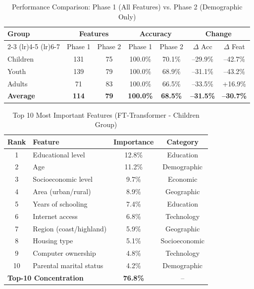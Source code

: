 \documentclass{article}
\begin{document}

\begin{table}[ht]
\centering
\caption{Performance Comparison: Phase 1 (All Features) vs. Phase 2 (Demographic Only)}
\label{tab:phase1_vs_phase2}
\begin{tabular}{lcccccc}
\toprule
\multirow{2}{*}{\textbf{Group}} & \multicolumn{2}{c}{\textbf{Features}} & \multicolumn{2}{c}{\textbf{Accuracy}} & \multicolumn{2}{c}{\textbf{Change}} \\
\cmidrule(lr){2-3} \cmidrule(lr){4-5} \cmidrule(lr){6-7}
& Phase 1 & Phase 2 & Phase 1 & Phase 2 & $\Delta$ Acc & $\Delta$ Feat \\
\midrule
Children & 131 & 75  & 100.0\% & 70.1\% & --29.9\% & --42.7\% \\
Youth    & 139 & 79  & 100.0\% & 68.9\% & --31.1\% & --43.2\% \\
Adults   & 71  & 83  & 100.0\% & 66.5\% & --33.5\% & +16.9\% \\
\midrule
\textbf{Average} & \textbf{114} & \textbf{79} & \textbf{100.0\%} & \textbf{68.5\%} & \textbf{--31.5\%} & \textbf{--30.7\%} \\
\bottomrule
\end{tabular}
\end{table}


\begin{table}[ht]
\centering
\caption{Top 10 Most Important Features (FT-Transformer - Children Group)}
\label{tab:feature_importance}
\begin{tabular}{clcc}
\toprule
\textbf{Rank} & \textbf{Feature} & \textbf{Importance} & \textbf{Category} \\
\midrule
1  & Educational level        & 12.8\% & Education \\
2  & Age                      & 11.2\% & Demographic \\
3  & Socioeconomic level      & 9.7\%  & Economic \\
4  & Area (urban/rural)       & 8.9\%  & Geographic \\
5  & Years of schooling       & 7.4\%  & Education \\
6  & Internet access          & 6.8\%  & Technology \\
7  & Region (coast/highland)  & 5.9\%  & Geographic \\
8  & Housing type             & 5.1\%  & Socioeconomic \\
9  & Computer ownership       & 4.8\%  & Technology \\
10 & Parental marital status  & 4.2\%  & Demographic \\
\midrule
\multicolumn{2}{l}{\textbf{Top-10 Concentration}} & \textbf{76.8\%} & -- \\
\bottomrule
\end{tabular}
\end{table}
\end{document}
